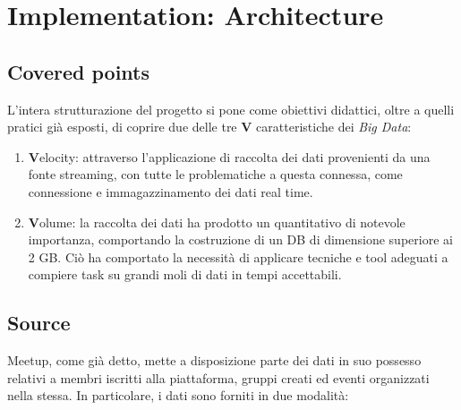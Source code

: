 \documentclass[fleqn,10pt]{SelfArx} %
\begin{document}
\section{Implementation: Architecture}
{\small %
\subsection{Covered points}
L'intera strutturazione del progetto si pone come obiettivi didattici, oltre a quelli pratici già esposti, di coprire due delle tre \textbf{V} caratteristiche dei \textit{Big Data}:
\begin{enumerate}
\item \textbf{V}elocity: attraverso l'applicazione di raccolta dei dati provenienti da una fonte streaming, con tutte le problematiche a questa connessa, come connessione e immagazzinamento dei dati real time.
\item \textbf{V}olume: la raccolta dei dati ha prodotto un quantitativo di notevole importanza, comportando la costruzione di un DB di dimensione superiore ai 2 GB. Ciò ha comportato la necessità di applicare tecniche e tool adeguati a compiere task su grandi moli di dati in tempi accettabili.
\end{enumerate}
\subsection{Source}%
Meetup, come già detto, mette a disposizione parte dei dati in suo possesso relativi a membri iscritti alla piattaforma, gruppi creati ed eventi organizzati nella stessa. 
In particolare, i dati sono forniti in due modalità: 

}
\end{document}
